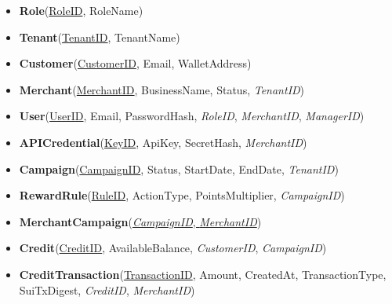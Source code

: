 \begin{itemize}
    \item \textbf{Role}(\underline{RoleID}, RoleName)
    \item \textbf{Tenant}(\underline{TenantID}, TenantName)
    \item \textbf{Customer}(\underline{CustomerID}, Email, WalletAddress)
    \item \textbf{Merchant}(\underline{MerchantID}, BusinessName, Status, \textit{TenantID})
    \item \textbf{User}(\underline{UserID}, Email, PasswordHash, \textit{RoleID}, \textit{MerchantID}, \textit{ManagerID})
    \item \textbf{APICredential}(\underline{KeyID}, ApiKey, SecretHash, \textit{MerchantID})
    \item \textbf{Campaign}(\underline{CampaignID}, Status, StartDate, EndDate, \textit{TenantID})
    \item \textbf{RewardRule}(\underline{RuleID}, ActionType, PointsMultiplier, \textit{CampaignID})
    \item \textbf{MerchantCampaign}(\underline{\textit{CampaignID}, \textit{MerchantID}})
    \item \textbf{Credit}(\underline{CreditID}, AvailableBalance, \textit{CustomerID}, \textit{CampaignID})
    \item \textbf{CreditTransaction}(\underline{TransactionID}, Amount, CreatedAt, TransactionType, SuiTxDigest, \textit{CreditID}, \textit{MerchantID})
\end{itemize}

